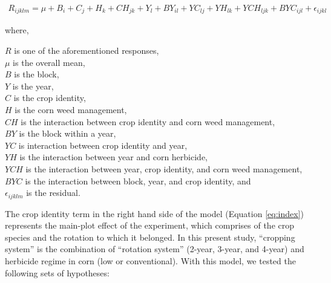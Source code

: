 \documentclass[
]{article}
\begin{document}
\begin{align}
R_{ijklm} = \mu + B_i + C_j + H_k + CH_{jk} + Y_l + BY_{il} + YC_{lj} + YH_{lk} + YCH_{ljk} + BYC_{ijl} + \epsilon_{ijkl}
\label{eq:index}
\end{align}

where,

\(R\) is one of the aforementioned responses,\\
\(\mu\) is the overall mean,\\
\(B\) is the block,\\
\(Y\) is the year,\\
\(C\) is the crop identity,\\
\(H\) is the corn weed management,\\
\(CH\) is the interaction between crop identity and corn weed management,\\
\(BY\) is the block within a year,\\
\(YC\) is interaction between crop identity and year,\\
\(YH\) is the interaction between year and corn herbicide,\\
\(YCH\) is the interaction between year, crop identity, and corn weed management,\\
\(BYC\) is the interaction between block, year, and crop identity, and\\
\(\epsilon_{ijklm}\) is the residual.

The crop identity term in the right hand side of the model (Equation \eqref{eq:index}) represents the main-plot effect of the experiment, which comprises of the crop species and the rotation to which it belonged. In this present study, ``cropping system'' is the combination of ``rotation system'' (2-year, 3-year, and 4-year) and herbicide regime in corn (low or conventional). With this model, we tested the following sets of hypotheses:
\end{document}
